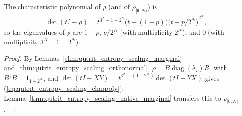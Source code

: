 \begin{lemma}
    \label{thm:qutrit_entropy_scaling_spectrum}
    \leanok
    The characteristic polynomial of $\rho$ (and of $\rho_{[0,N)}$) is
    \begin{align}
        \det(tI-\rho)
        =t^{3^N-1-2^N}\bigl(t-(1-p)\bigr)
        {\bigl(t-p/2^N\bigr)}^{2^N},
        \label{eq:qutrit_entropy_scaling_charpoly}
    \end{align}
    so the eigenvalues of $\rho$ are $1-p$, $p/2^N$ (with multiplicity $2^N$),
    and $0$ (with multiplicity $3^N-1-2^N$).
\end{lemma}
\begin{proof}\leanok
    By Lemmas~\ref{thm:qutrit_entropy_scaling_marginal}
    and~\ref{thm:qutrit_entropy_scaling_orthonormal},
    $\rho=B\operatorname{diag}(\lambda_i)B^\dagger$ with $B^\dagger B=1_{1+2^N}$,
    and $\det(tI-XY)=t^{3^N-(1+2^N)}\det(tI-YX)$ gives
    (\ref{eq:qutrit_entropy_scaling_charpoly});
    Lemma~\ref{thm:qutrit_entropy_scaling_native_marginal} transfers this to
    $\rho_{[0,N)}$.
\end{proof}
